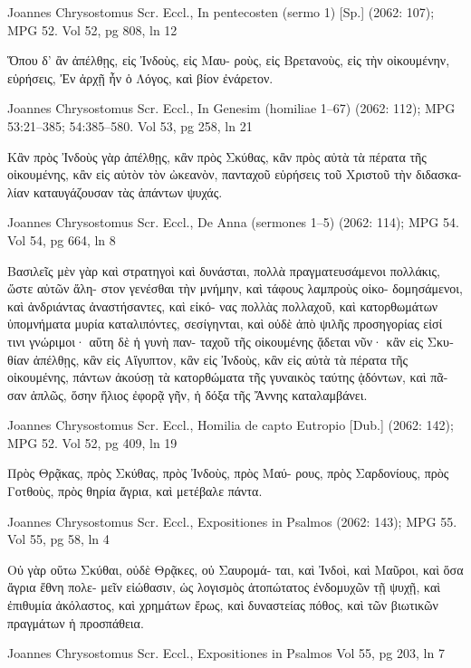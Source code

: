 \documentclass[12pt,letterpaper,twoside,final]{memoir}
\begin{document}
\begin{greek}
Joannes Chrysostomus Scr. Eccl., In pentecosten (sermo 1) [Sp.] (2062: 107); MPG 52.
Vol 52, pg 808, ln 12

         Ὅπου δ' ἂν ἀπέλθῃς, εἰς Ἰνδοὺς, εἰς Μαυ-
ροὺς, εἰς Βρετανοὺς, εἰς τὴν οἰκουμένην, εὑρήσεις, 
Ἐν ἀρχῇ ἦν ὁ Λόγος, καὶ βίον ἐνάρετον. 



Joannes Chrysostomus Scr. Eccl., In Genesim (homiliae 1–67) (2062: 112); MPG 53:21–385; 54:385–580.
Vol 53, pg 258, ln 21

       Κἂν πρὸς Ἰνδοὺς γὰρ ἀπέλθῃς, κἂν πρὸς Σκύθας, 
κἂν πρὸς αὐτὰ τὰ πέρατα τῆς οἰκουμένης, κἂν εἰς αὐτὸν 
τὸν ὠκεανὸν, πανταχοῦ εὑρήσεις τοῦ Χριστοῦ τὴν διδασκα-
λίαν καταυγάζουσαν τὰς ἁπάντων ψυχάς. 



Joannes Chrysostomus Scr. Eccl., De Anna (sermones 1–5) (2062: 114); MPG 54.
Vol 54, pg 664, ln 8

         Βασιλεῖς μὲν γὰρ καὶ στρατηγοὶ καὶ δυνάσται,    
πολλὰ πραγματευσάμενοι πολλάκις, ὥστε αὐτῶν ἄλη-
στον γενέσθαι τὴν μνήμην, καὶ τάφους λαμπροὺς οἰκο-
δομησάμενοι, καὶ ἀνδριάντας ἀναστήσαντες, καὶ εἰκό-
νας πολλὰς πολλαχοῦ, καὶ κατορθωμάτων ὑπομνήματα 
μυρία καταλιπόντες, σεσίγηνται, καὶ οὐδὲ ἀπὸ ψιλῆς 
προσηγορίας εἰσί τινι γνώριμοι· αὕτη δὲ ἡ γυνὴ παν-
ταχοῦ τῆς οἰκουμένης ᾄδεται νῦν· κἂν εἰς Σκυθίαν 
ἀπέλθῃς, κἂν εἰς Αἴγυπτον, κἂν εἰς Ἰνδοὺς, κἂν εἰς 
αὐτὰ τὰ πέρατα τῆς οἰκουμένης, πάντων ἀκούσῃ τὰ 
κατορθώματα τῆς γυναικὸς ταύτης ᾀδόντων, καὶ πᾶ-
σαν ἁπλῶς, ὅσην ἥλιος ἐφορᾷ γῆν, ἡ δόξα τῆς Ἄννης 
καταλαμβάνει. 



Joannes Chrysostomus Scr. Eccl., Homilia de capto Eutropio [Dub.] (2062: 142); MPG 52.
Vol 52, pg 409, ln 19

Πρὸς Θρᾷκας, πρὸς Σκύθας, πρὸς Ἰνδοὺς, πρὸς Μαύ-
ρους, πρὸς Σαρδονίους, πρὸς Γοτθοὺς, πρὸς θηρία 
ἄγρια, καὶ μετέβαλε πάντα. 



Joannes Chrysostomus Scr. Eccl., Expositiones in Psalmos (2062: 143); MPG 55.
Vol 55, pg 58, ln 4

      Οὐ γὰρ οὕτω Σκύθαι, οὐδὲ Θρᾷκες, οὐ Σαυρομά-
ται, καὶ Ἰνδοὶ, καὶ Μαῦροι, καὶ ὅσα ἄγρια ἔθνη πολε-
μεῖν εἰώθασιν, ὡς λογισμὸς ἀτοπώτατος ἐνδομυχῶν τῇ 
ψυχῇ, καὶ ἐπιθυμία ἀκόλαστος, καὶ χρημάτων ἔρως, 
καὶ δυναστείας πόθος, καὶ τῶν βιωτικῶν πραγμάτων 
ἡ προσπάθεια. 



Joannes Chrysostomus Scr. Eccl., Expositiones in Psalmos 
Vol 55, pg 203, ln 7


\end{greek}
\end{document}
